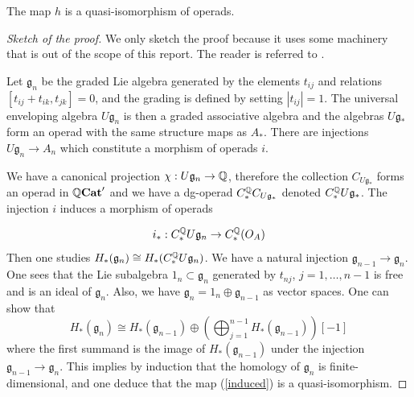 \documentclass[TFM.tex]{subfiles}
\begin{document}
\begin{prop}\label{4.1}
The map $h$ is a quasi-isomorphism of operads. 
\end{prop}
\begin{proof}[Sketch of the proof] We only sketch the proof because it uses some machinery that is out of the scope of this report. The reader is referred to \cite{Tamarkin}.

Let $\mathfrak{g}_n$ be the graded Lie algebra generated by the elements $t_{ij}$ and
relations $[t_{ij}+t_{ik},t_{jk}]=0$, and the grading is defined by setting $|t_{ij}|= 1$. The universal enveloping algebra $U\mathfrak{g}_n$ is then a graded associative algebra and the algebras $U\mathfrak{g}_*$ form an operad with the same structure maps as $A_*$. There are injections $U\mathfrak{g}_n\to A_n$ which constitute a morphism of operads $i$.

We have a canonical projection $\chi:U\mathfrak{g}_n\to\mathbb{Q}$, therefore the collection $C_{U\mathfrak{g}_*}$ forms an operad in $\mathbb{Q}\mathrm{\mathbf{Cat}}'$ and we have a dg-operad $C_*^{\mathbb{Q}} C_{U\mathfrak{g}_*}$ denoted $C_*^{\mathbb{Q}} U\mathfrak{g}_*$. The injection $i$ induces a morphism of operads 

\begin{equation}\label{induced}
i_*:C_*^{\mathbb{Q}} U\mathfrak{g}_n\to C_*^{\mathbb{Q}}(O_A)
\end{equation}
Then one studies $H_*(\mathfrak{g}_n)\cong H_*(C_*^{\mathbb{Q}} U\mathfrak{g}_n)$. We have a natural injection $\mathfrak{g}_{n-1}\to \mathfrak{g}_n$. One sees that the Lie subalgebra $\mathfrak{1}_n\subset \mathfrak{g}_n$ generated by $t_{nj}$, $j=1,\dots, n-1$ is free and is an ideal of $\mathfrak{g}_n$. Also, we have $\mathfrak{g}_n=\mathfrak{1}_n\oplus\mathfrak{g}_{n-1}$ as vector spaces. One can show that
\begin{equation}\label{homology}
H_*(\mathfrak{g}_n)\cong H_*(\mathfrak{g}_{n-1})\oplus \left(\bigoplus_{j=1}^{n-1}H_*(\mathfrak{g}_{n-1})\right)[-1]
\end{equation}
where the first summand is the image of $H_*(\mathfrak{g}_{n-1})$ under the injection $\mathfrak{g}_{n-1}\to \mathfrak{g}_n$. This implies by induction that the homology of $\mathfrak{g}_n$ is finite-dimensional, and one deduce that
the map (\ref{induced}) is a quasi-isomorphism. 


\end{proof}
\end{document}
